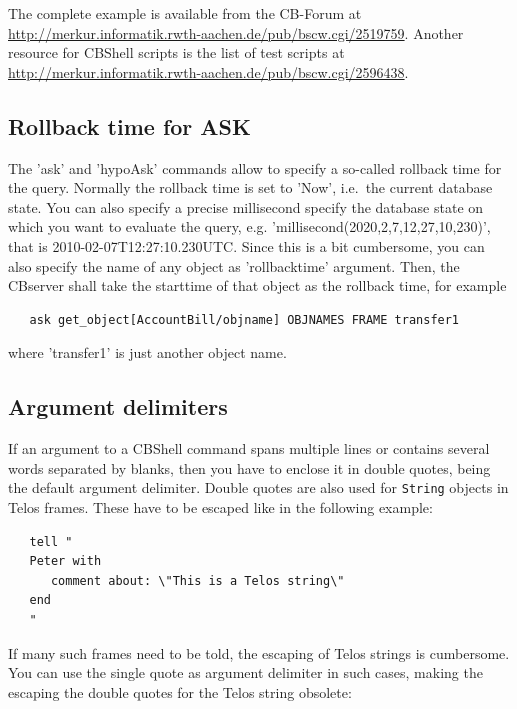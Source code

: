 The complete example is available from the CB-Forum at \url{http://merkur.informatik.rwth-aachen.de/pub/bscw.cgi/2519759}.
Another resource for CBShell scripts is the list of test scripts at
\url{http://merkur.informatik.rwth-aachen.de/pub/bscw.cgi/2596438}.

\subsection{Rollback time for ASK}
\label{sec:rollbacktime}

The 'ask' and 'hypoAsk' commands allow to specify a so-called rollback time for the query.
Normally the rollback time is set to 'Now', i.e.\ the current database state. You can
also specify a precise millisecond specify the database state on which you want to evaluate
the query, e.g. 'millisecond(2020,2,7,12,27,10,230)', that is 2010-02-07T12:27:10.230UTC.
Since this is a bit cumbersome, you can also specify the name of any object as 'rollbacktime'
argument. Then, the CBserver shall take the starttime of that object as the rollback time,
for example 

\begin{verbatim}
   ask get_object[AccountBill/objname] OBJNAMES FRAME transfer1
\end{verbatim}

where 'transfer1' is just another object name.




\subsection{Argument delimiters}
\label{sec:argdelim}

If an argument to a CBShell command spans multiple lines or contains several words separated by
blanks, then you have to enclose it in double quotes, being the default argument delimiter.
Double quotes are also used for {\tt String}  objects in Telos frames. These have to be
escaped like in the following example:

\begin{verbatim}
   tell "
   Peter with 
      comment about: \"This is a Telos string\"
   end
   "
\end{verbatim}


If many such frames need to be told, the escaping of Telos strings is cumbersome.
You can use the single quote as argument delimiter in such cases, making the
escaping the double quotes for the Telos string obsolete:

